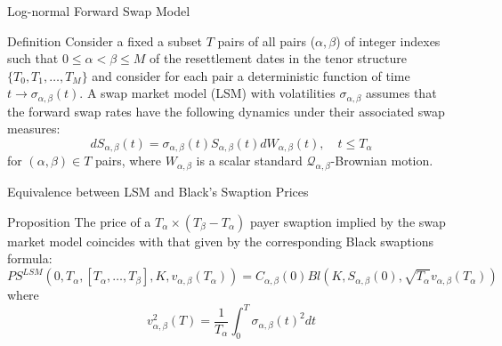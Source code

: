 \documentclass{beamer}
\begin{document}
\begin{frame}{Log-normal Forward Swap Model}
  \begin{block}{Definition}
    Consider a fixed a subset $T$ pairs of all pairs ($\alpha, \beta$) of integer indexes such that $0 \leq \alpha < \beta \leq M$ of the resettlement dates in the tenor structure $\{T_0, T_1,\ldots, T_M\}$ and consider for each pair a deterministic function of time $t\rightarrow \sigma_{\alpha,\beta}(t)$. A swap market model (LSM) with volatilities $\sigma_{\alpha,\beta}$ assumes that the forward swap rates have the following dynamics under their associated swap measures:
    \begin{equation}
      dS_{\alpha,\beta}(t) = \sigma_{\alpha,\beta}(t)S_{\alpha,\beta}(t)dW_{\alpha,\beta}(t),\quad t \leq T_\alpha
    \end{equation}
    for $(\alpha, \beta) \in T$ pairs, where $W_{\alpha,\beta}$ is a scalar standard $\mathcal{Q}_{\alpha,\beta}$-Brownian motion.
  \end{block}
\end{frame}

\begin{frame}{Equivalence between LSM and Black’s Swaption Prices}
  \begin{block}{Proposition}
    The price of a $T_\alpha\times(T_\beta-T_\alpha)$ payer swaption implied by the swap market model coincides with that given by the corresponding Black swaptions formula:
    \begin{equation}
      PS^{LSM}(0,T_\alpha, [T_\alpha,\ldots,T_\beta],K,v_{\alpha,\beta}(T_\alpha))=
      C_{\alpha, \beta}(0) Bl(K,S_{\alpha,\beta}(0),\sqrt{T_\alpha}v_{\alpha,\beta}(T_\alpha))
    \end{equation}
    where 
    \begin{equation*}
      v_{\alpha,\beta}^2(T) = \frac{1}{T_\alpha}\int_0^T\sigma_{\alpha,\beta}(t)^2dt 
    \end{equation*}
  \end{block}
\end{frame}
\end{document}
